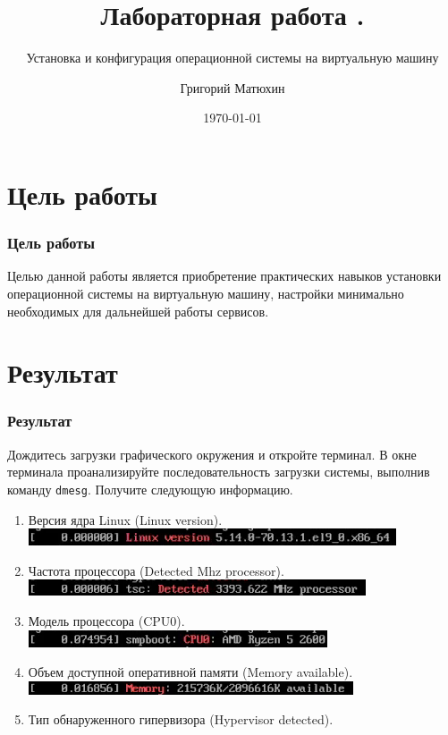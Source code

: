 \documentclass{beamer}
\author{Григорий Матюхин}
\date{\today}
\title{Лабораторная работа \textnumero1.}
\subtitle{Установка и конфигурация операционной системы на виртуальную машину}
\begin{document}
  \begin{frame}[plain]
  \titlepage
  \end{frame}
  \section{Цель работы}
  \begin{frame}[plain]
  \frametitle{Цель работы}
  Целью данной работы является приобретение практических навыков установки операционной системы на виртуальную машину, настройки минимально необходимых для дальнейшей работы сервисов.
  \end{frame}

  \section{Результат}
  \begin{frame}[plain]
  \frametitle{Результат}
    Дождитесь загрузки графического окружения и откройте терминал. В окне терминала проанализируйте последовательность загрузки системы, выполнив команду \texttt{dmesg}. Получите следующую информацию.
    \begin{enumerate}
      \item Версия ядра Linux (Linux version).
        \\\includegraphics{1.png}\\
      \item Частота процессора (Detected Mhz processor).
        \\\includegraphics{2.png}\\
      \item Модель процессора (CPU0).
        \\\includegraphics{3.png}\\
      \item Объем доступной оперативной памяти (Memory available).
        \\\includegraphics{4.png}\\
      \item Тип обнаруженного гипервизора (Hypervisor detected).

\end{enumerate}
\end{frame}
\end{document}
